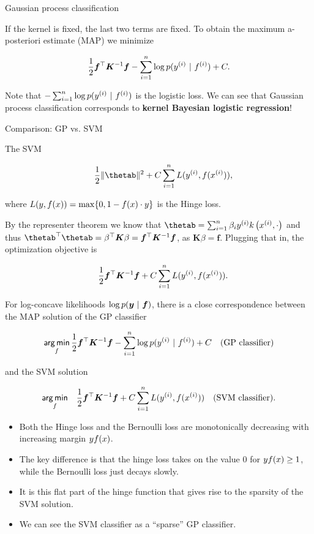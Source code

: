 \begin{vbframe}{Gaussian process classification}
\framebreak  

If the kernel is fixed, the last two terms are fixed. To obtain the maximum a-posteriori estimate (MAP) we minimize

$$
  \frac{1}{2} \bm{f}^\top \bm{K}^{-1} \bm{f} - \sum_{i=1}^n \log p(y^{(i)} ~|~ f^{(i)}) + C.
$$

Note that $- \sum_{i=1}^n \log p(y^{(i)} ~|~ f^{(i)})$
is the logistic loss. We can see that Gaussian process classification corresponds to \textbf{kernel Bayesian logistic regression}! 

\end{vbframe}

\begin{vbframe}{Comparison: GP vs. SVM }

The SVM 

\begin{eqnarray*}
  && \frac{1}{2} \|\thetab\|^2 + C \sumin \Lxyi, \\
\end{eqnarray*}

where $L(y, f(x)) = \max\{0, 1-f(x)\cdot y\}$ is the Hinge loss. 

\lz 

By the representer theorem we know that $\thetab = \sumin \beta_i \yi k\left(\xi, \cdot \right)$ and thus $\thetab^\top \thetab = \beta^\top \bm{K} \beta = \bm{f}^\top \bm{K}^{-1} \bm{f}$, as $\bm{K} \beta = \bm{f}$. Plugging that in, the optimization objective is

\begin{eqnarray*}
  && \frac{1}{2} \bm{f}^\top \bm{K}^{-1} \bm{f} + C \sum_{i=1}^n L(y^{(i)}, f(x^{(i)})). 
\end{eqnarray*}

\framebreak  

For log-concave likelihoods $\log p(\bm{y} ~|~ \bm{f})$, there is a close correspondence between the MAP solution of the GP classifier

$$
  \mathop{\sf arg\,min}_f \frac{1}{2} \bm{f}^\top \bm{K}^{-1} \bm{f} - \sum_{i=1}^n \log p(y^{(i)} ~|~ f^{(i)}) + C \quad \text{(GP classifier)}
$$

and the SVM solution

\begin{eqnarray*}
  \mathop{\sf arg\,min}_f && \frac{1}{2} \bm{f}^\top \bm{K}^{-1} \bm{f} + C \sum_{i=1}^n L(y^{(i)}, f(x^{(i)})) \quad \text{(SVM classifier)}. 
\end{eqnarray*}

\framebreak 

\begin{itemize}
\item Both the Hinge loss and the Bernoulli loss are monotonically decreasing with increasing margin $y f(x)$. 
\item The key difference is that the hinge loss takes on the value $0$ for $y f(x) \ge 1$, while the Bernoulli loss just decays slowly. 
\item It is this flat part of the hinge function that gives rise to the sparsity of the SVM solution. \item We can see the SVM classifier as a \enquote{sparse} GP classifier.  
\end{itemize}


\end{vbframe}
